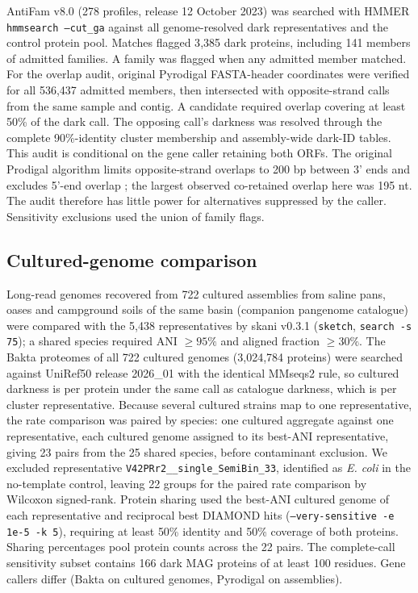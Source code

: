 \documentclass[11pt]{article}
\begin{document}
AntiFam v8.0 (278 profiles, release 12 October 2023) was searched with HMMER
\texttt{hmmsearch --cut\_ga} against all genome-resolved dark representatives and the control
protein pool. Matches flagged 3{,}385 dark proteins, including 141 members of admitted families.
A family was flagged when any admitted member matched. For the overlap audit, original Pyrodigal
FASTA-header coordinates were verified for all 536{,}437 admitted members, then intersected with
opposite-strand calls from the same sample and contig. A candidate required overlap covering at
least 50\% of the dark call. The opposing call's darkness was resolved through the complete
90\%-identity cluster membership and assembly-wide dark-ID tables. This audit is conditional on
the gene caller retaining both ORFs. The original Prodigal algorithm limits opposite-strand overlaps to 200 bp between 3' ends and excludes 5'-end overlap \citep{hyatt2010prodigal}; the largest observed co-retained overlap here was 195 nt. The audit therefore has little power for alternatives suppressed by the caller. Sensitivity exclusions used the union of family flags.

\subsection*{Cultured-genome comparison}
Long-read genomes recovered from 722 cultured assemblies from saline pans, oases and campground soils of the
same basin (companion pangenome catalogue) were compared with the 5{,}438 representatives by skani
v0.3.1 \citep{shaw2023skani} (\texttt{sketch}, \texttt{search -s 75}); a shared species required ANI $\geq 95\%$ and aligned
fraction $\geq 30\%$. The Bakta proteomes of all 722 cultured genomes (3{,}024{,}784 proteins) were
searched against UniRef50 release 2026\_01 with the identical MMseqs2 rule, so cultured darkness is per protein under
the same call as catalogue darkness, which is per cluster representative. Because several cultured strains map to one representative,
the rate comparison was paired by species: one cultured aggregate against one representative, each
cultured genome assigned to its best-ANI representative, giving 23 pairs from the 25 shared species,
before contaminant exclusion. We excluded representative \texttt{V42PRr2\_\_single\_SemiBin\_33},
identified as \emph{E. coli} in the no-template control, leaving 22 groups for the paired rate
comparison by Wilcoxon signed-rank. Protein sharing used the best-ANI cultured genome of each
representative and reciprocal best DIAMOND hits (\texttt{--very-sensitive -e 1e-5 -k 5}),
requiring at least 50\% identity and 50\% coverage of both proteins. Sharing percentages pool
protein counts across the 22 pairs. The complete-call sensitivity subset contains 166 dark MAG
proteins of at least 100 residues. Gene callers differ (Bakta on cultured genomes, Pyrodigal
on assemblies).
\end{document}
